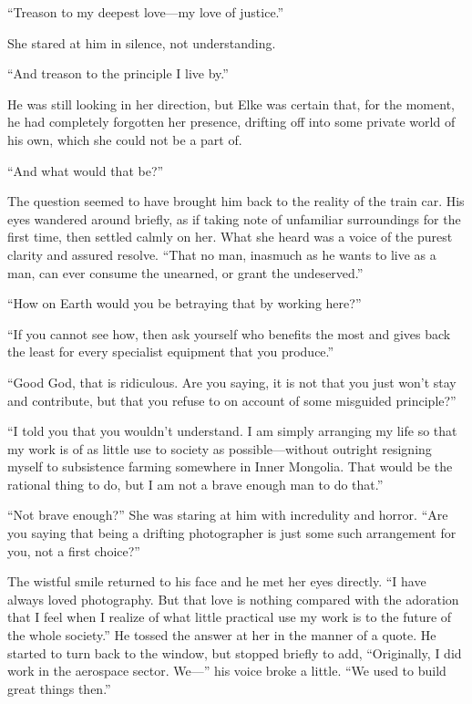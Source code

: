 ``Treason to my deepest love---my love of justice.''

She stared at him in silence, not understanding.

``And treason to the principle I live by.''

He was still looking in her direction, but Elke was certain that, for the moment, he had completely forgotten her presence, drifting off into some private world of his own, which she could not be a part of.

``And what would that be?''

The question seemed to have brought him back to the reality of the train car. His eyes wandered around briefly, as if taking note of unfamiliar surroundings for the first time, then settled calmly on her. What she heard was a voice of the purest clarity and assured resolve. ``That no man, inasmuch as he wants to live as a man, can ever consume the unearned, or grant the undeserved.''

``How on Earth would you be betraying that by working here?''

``If you cannot see how, then ask yourself who benefits the most and gives back the least for every specialist equipment that you produce.''

``Good God, that is ridiculous. Are you saying, it is not that you just won't stay and contribute, but that you refuse to on account of some misguided principle?''

``I told you that you wouldn't understand. I am simply arranging my life so that my work is of as little use to society as possible---without outright resigning myself to subsistence farming somewhere in Inner Mongolia. That would be the rational thing to do, but I am not a brave enough man to do that.''

``Not brave enough?'' She was staring at him with incredulity and horror. ``Are you saying that being a drifting photographer is just some such arrangement for you, not a first choice?''

The wistful smile returned to his face and he met her eyes directly. ``I have always loved photography. But that love is nothing compared with the adoration that I feel when I realize of what little practical use my work is to the future of the whole society.'' He tossed the answer at her in the manner of a quote. He started to turn back to the window, but stopped briefly to add, ``Originally, I did work in the aerospace sector. We---'' his voice broke a little. ``We used to build great things then.''


